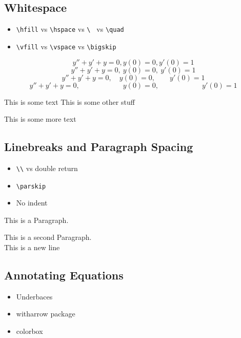 \documentclass{report}
\begin{document}
\subsection{Whitespace}
\begin{itemize}
    \item \verb|\hfill| vs \verb|\hspace| vs \verb|\ | vs \verb|\quad|
    \item \verb|\vfill| vs \verb|\vspace| vs \verb|\bigskip|
\end{itemize}

\[y'' + y' + y = 0, y(0) = 0, y'(0) = 1\]
\[y'' + y' + y = 0,\  y(0) = 0,\  y'(0) = 1\]
\[y'' + y' + y = 0,\quad  y(0) = 0,\qquad  y'(0) = 1\]
\[y'' + y' + y = 0,\hspace{1in}  y(0) = 0,\hspace{1in}  y'(0) = 1\]

This is some text \hfill This is some other stuff

\vfill

This is some more text \newpage

\subsection{Linebreaks and Paragraph Spacing}
\begin{itemize}
    \item \verb|\\| vs double return
    \item \verb|\parskip|
    \item No indent
\end{itemize}

\noindent This is a Paragraph.

This is a second Paragraph. \\ This is a new line

\subsection{Annotating Equations}

\begin{itemize}
    \item Underbaces
    \item witharrow package
    \item colorbox
\end{itemize}
\end{document}
